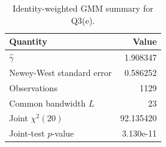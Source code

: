 \begin{table}[htbp]
\centering
\caption{Identity-weighted GMM summary for Q3(e).}
\label{tab:q3e-gmm-summary}
\begin{tabular}{lr}
\hline
Quantity & Value \\
\hline
$\widehat{\gamma}$ & 1.908347 \\
Newey-West standard error & 0.586252 \\
Observations & 1129 \\
Common bandwidth $L$ & 23 \\
Joint $\chi^2(20)$ & 92.135420 \\
Joint-test $p$-value & 3.130e-11 \\
\hline
\end{tabular}
\end{table}
